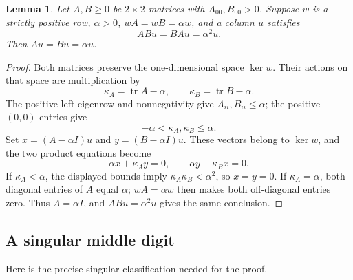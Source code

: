 \documentclass[11pt,a4paper]{article}
\newtheorem{lemma}[theorem]{Lemma}
\newcommand{\tr}{\operatorname{tr}}
\begin{document}
\begin{lemma}\label{lem:matrix-stationary}
Let $A,B\ge0$ be $2\times2$ matrices with $A_{00},B_{00}>0$. Suppose
$w$ is a strictly positive row, $\alpha>0$,
$wA=wB=\alpha w$, and a column $u$ satisfies
\[
ABu=BAu=\alpha^2u.
\]
Then $Au=Bu=\alpha u$.
\end{lemma}
\begin{proof}
Both matrices preserve the one-dimensional space $\ker w$. Their
actions on that space are multiplication by
\[
\kappa_A=\tr A-\alpha,\qquad
\kappa_B=\tr B-\alpha.
\]
The positive left eigenrow and nonnegativity give
$A_{ii},B_{ii}\le\alpha$; the positive $(0,0)$ entries give
\[
-\alpha<\kappa_A,\kappa_B\le\alpha.
\]
Set $x=(A-\alpha I)u$ and $y=(B-\alpha I)u$. These vectors belong to
$\ker w$, and the two product equations become
\[
\alpha x+\kappa_Ay=0,\qquad
\alpha y+\kappa_Bx=0.
\]
If $\kappa_A<\alpha$, the displayed bounds imply
$\kappa_A\kappa_B<\alpha^2$, so $x=y=0$. If
$\kappa_A=\alpha$, both diagonal entries of $A$ equal $\alpha$;
$wA=\alpha w$ then makes both off-diagonal entries zero. Thus
$A=\alpha I$, and $ABu=\alpha^2u$ gives the same conclusion.
\end{proof}

\subsection{A singular middle digit}
Here is the precise singular classification needed for the proof.
\end{document}

